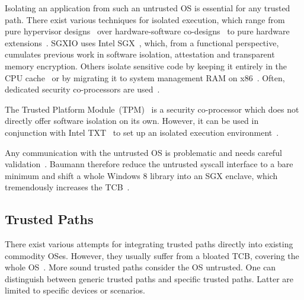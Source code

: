 \documentclass{sig-alternate-05-2015}
\begin{document}
Isolating an application from such an untrusted OS is essential for any trusted path. 
There exist various techniques for isolated execution, which range from pure hypervisor designs~\cite{overshadow,sp3,ta-min_splitting_2006,mccune_trustvisor:_2010,hofmann_inktag:_2013,criswell_virtual_2014} over hardware-software co-designs~\cite{suh_aegis:_2003,champagne_scalable_2010,secureme} to pure hardware extensions~\cite{thekkath_architectural_2000,owusu_oasis:_2013,secureblue,sgxmanual,evtyushkin_iso-x:_2014,costan_sanctum:_2016,trustzone}. 
SGXIO uses Intel SGX~\cite{sgxmanual}, which, from a functional perspective, cumulates previous work in software isolation, attestation and transparent memory encryption. 
Others isolate sensitive code by keeping it entirely in the CPU cache~\cite{carma} or by migrating it to system management RAM on x86~\cite{azab_sice:_2011}. Often,  dedicated security co-processors are used~\cite{smith_building_1999}. 

The Trusted Platform Module~(TPM)~\cite{tpm} is a security co-processor which does not directly offer software isolation on its own. However, it can be used in conjunction with Intel TXT~\cite{inteltxtmanual} to set up an isolated execution environment~\cite{mccune_flicker:_2008}.

Any communication with the untrusted OS is problematic and needs careful validation~\cite{ports_towards_2008,checkoway_iago_2013}. 
Baumann \etal therefore reduce the untrusted syscall interface to a bare minimum and shift a whole Windows 8 library into an SGX enclave, which tremendously increases the TCB~\cite{haven}. 

\subsection{Trusted Paths}

There exist various attempts for integrating trusted paths directly into existing commodity OSes. However, they usually suffer from a bloated TCB, covering the whole OS~\cite{liu_screenpass:_2013,tong_guardroid:_2013,lange_crossover:_2013,fernandes_tivos:_2014}.
More sound trusted paths consider the OS untrusted. One can distinguish between generic trusted paths and specific trusted paths. Latter are limited to specific devices or scenarios. 
\end{document}
